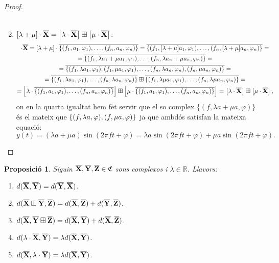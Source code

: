\documentclass{article}
\theoremstyle{math}
\newtheorem{prop}[definition]{Proposició}
\newcommand{\0}{\ensuremath{\vb{0}}}
\newcommand{\X}{\ensuremath{\vb{X}}}
\newcommand{\Y}{\ensuremath{\vb{Y}}}
\newcommand{\Z}{\ensuremath{\vb{Z}}}
\newcommand{\RR}{\ensuremath{\mathbb{R}}} %
\begin{document}
\begin{proof}
\begin{enumerate}
\begin{multline*}
        \end{multline*}
        \item $[\lambda+\mu]\cdot \overline{\X}=\left[\lambda \cdot \overline{\X}\right] \boxplus\left[\mu \cdot \overline{\X}\right]$:
        \begin{multline*}
            [\lambda+\mu]\cdot \overline{\X}=[\lambda+\mu]\cdot\overline{\{(f_1,a_1,\varphi_1),\ldots,(f_n,a_n,\varphi_n)\}}=\overline{\{(f_1,[\lambda+\mu]a_1,\varphi_1),\ldots,(f_n,[\lambda+\mu]a_n,\varphi_n)\}}=\\=\overline{\{(f_1,\lambda a_1+\mu a_1,\varphi_1),\ldots,(f_n,\lambda a_n+\mu a_n,\varphi_n)\}}=\\=\overline{\{(f_1,\lambda a_1,\varphi_1),(f_1,\mu a_1,\varphi_1),\ldots,(f_n,\lambda a_n,\varphi_n),(f_n,\mu a_n,\varphi_n)\}}=\\=\overline{\{(f_1,\lambda a_1,\varphi_1),\ldots,(f_n,\lambda a_n,\varphi_n)\}}\boxplus\overline{\{(f_1,\lambda\mu a_1,\varphi_1),\ldots,(f_n,\lambda\mu a_n,\varphi_n)\}}=\\=\left[\lambda\cdot\overline{\{(f_1,a_1,\varphi_1),\ldots,(f_n,a_n,\varphi_n)\}}\right]\boxplus\left[\mu\cdot\overline{\{(f_1,a_1,\varphi_1),\ldots,(f_n,a_n,\varphi_n)\}}\right]=\left[\lambda \cdot \overline{\X}\right] \boxplus\left[\mu \cdot \overline{\X}\right],
        \end{multline*}
        on en la quarta igualtat hem fet servir que el so complex $\{(f,\lambda a+\mu a,\varphi)\}$ és el mateix que $\{(f,\lambda a,\varphi),\\(f,\mu a,\varphi)\}$ ja que ambdós satisfan la mateixa equació: $$y(t)=(\lambda a+\mu a)\sin(2\pi ft+\varphi)=\lambda a\sin(2\pi ft+\varphi)+\mu a\sin(2\pi ft+\varphi).$$
    \end{enumerate}
\end{proof}
\begin{prop}
    Siguin $\overline{\X},\overline{\Y},\overline{\Z}\in\mathfrak{C}$ sons complexos i $\lambda\in\RR$. Llavors:
    \begin{enumerate}[label=$d$\arabic*),ref=$d$\arabic*]
        \item\label{dd1} $d(\overline{\X},\overline{\Y})=d(\overline{\Y},\overline{\X})$.
        \item\label{dd2} $d(\overline{\X}\boxplus\overline{\Y},\overline{\Z})=d(\overline{\X},\overline{\Z})+d(\overline{\Y},\overline{\Z})$.
        \item\label{dd3} $d(\overline{\X},\overline{\Y}\boxplus\overline{\Z})=d(\overline{\X},\overline{\Y})+d(\overline{\X},\overline{\Z})$.
        \item\label{dd4} $d(\lambda\cdot\overline{\X},\overline{\Y})=\lambda d(\overline{\X},\overline{\Y})$.
        \item\label{dd5} $d(\overline{\X},\lambda\cdot\overline{\Y})=\lambda d(\overline{\X},\overline{\Y})$.
    \end{enumerate}
\end{prop}
\end{document}
